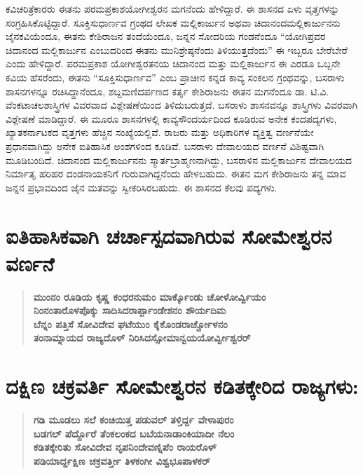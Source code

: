 ಕವಿಚರಿತ್ರೆಕಾರರು ಈತನು ಪರಮಪ್ರಕಾಶಯೋಗೀಶ್ವರನ ಮಗನೆಂದು ಹೇಳಿದ್ದಾರೆ. ಈ ಶಾಸನದ ಏಳು ವೃತ್ತಗಳನ್ನು ಸಂಗ್ರಹಿಸಿಕೊಟ್ಟಿದ್ದಾರೆ. ಸೂಕ್ತಿಸುಧಾರ್ಣವ ಗ್ರಂಥದ ಲೇಖಕ ಮಲ್ಲಿಕಾರ್ಜುನ ಅಥವಾ ಚಿದಾನಂದಮಲ್ಲಿಕಾರ್ಜುನನು ಜೈನಕವಿಯೆಂದೂ, ಈತನು ಕೇಶಿರಾಜನ ತಂದೆಯೆಂದೂ, ಜನ್ನನ ಸೋದರಿಯ ಗಂಡನೆಂದೂ “ಯೋಗಿಪ್ರವರ ಚಿದಾನಂದ ಮಲ್ಲಿಕಾರ್ಜುನ ಎಂಬುದರಿಂದ ಈತನು ಮುನಿಶ್ರೇಷ್ಠನೆಂದು ತಿಳಿಯುತ್ತದೆಂದು” ಈ ಇಬ್ಬರೂ ಬೇರೆಬೇರೆ ಎಂದು ಹೇಳಿದ್ದಾರೆ. ಪರಮಪ್ರಕಾಶ ಯೋಗೀಶ್ವರತನಯ ಚಿದಾನಂದ ಮತ್ತು ಮಲ್ಲಿಕಾರ್ಜುನ ಈ ಎರಡೂ ಒಬ್ಬನೇ ಕವಿಯ ಹೆಸರೆಂದು, ಈತನು “ಸೂಕ್ತಿಸುಧಾರ್ಣವ” ಎಂಬ ಪ್ರಾಚೀನ ಕನ್ನಡ ಕಾವ್ಯ ಸಂಕಲನ ಗ್ರಂಥವನ್ನು, ಬಸರಾಳು ಶಾಸನಗಳನ್ನೂ ರಚಿಸಿದ್ದಾನೆಂದೂ, ಶಬ್ದಮಣಿದರ್ಪಣದ ಕರ್ತೃ ಕೇಶಿರಾಜನು ಈತನ ಮಗನೆಂದೂ ಡಾ. ಟಿ.ವಿ. ವೆಂಕಟಾಚಲಶಾಸ್ತ್ರಿಗಳ ವಿವರವಾದ ವಿಶ್ಲೇಷಣೆಯಿಂದ ತಿಳಿದುಬರುತ್ತದೆ. ಬಸರಾಳು ಶಾಸನವನ್ನೂ ಶಾಸ್ತ್ರಿಗಳು ವಿವರವಾಗಿ ವಿಶ್ಲೇಷಣೆ ಮಾಡಿದ್ದಾರೆ. ಈ ಮೂರೂ ಶಾಸನಗಳಲ್ಲಿ ಕಾವ್ಯಸೌಂದರ್ಯದಿಂದ ಕೂಡಿರುವ ಅನೇಕ ಕಂದಪದ್ಯಗಳು, ಖ್ಯಾತಕರ್ನಾಟಕದ ವೃತ್ತಗಳು ಹೆಚ್ಚಿನ ಸಂಖ್ಯೆಯಲ್ಲಿವೆ. ರಾಜರು ಮತ್ತು ಅಧಿಕಾರಿಗಳ ವ್ಯಕ್ತಿತ್ವ ವರ್ಣನೆಯೇ ಪ್ರಧಾನವಾಗಿದ್ದು ಅನೇಕ ಐತಿಹಾಸಿಕ ಅಂಶಗಳಿಂದ ಕೂಡಿವೆ. ಬಸರಾಳು ದೇವಾಲಯದ ವರ್ಣನೆ ವಿಶಿಷ್ಟವಾಗಿ ಮೂಡಿಬಂದಿದೆ. ಚಿದಾನಂದ ಮಲ್ಲಿಕಾರ್ಜುನನು ಸ್ಮಾರ್ತ\break ಬ್ರಾಹ್ಮಣನಾಗಿದ್ದು, ಬಸರಾಳಿನ ಮಲ್ಲಿಕಾರ್ಜುನ ದೇವಾಲಯದ ನಿರ್ಮಾತೃ ಹರಿಹರ ದಂಡನಾಯಕನಿಗೆ ಗುರುವಾಗಿದ್ದನೆಂದು ಹೇಳಬಹುದು. ಈತನ ಮಗ ಕೇಶಿರಾಜನು ತನ್ನ ಮಾವ ಜನ್ನನ ಪ್ರಭಾವದಿಂದ ಜೈನ ಮತವನ್ನು ಸ್ವೀಕರಿಸಿರಬಹುದು. ಈ ಶಾಸನದ ಕೆಲವು ಪದ್ಯಗಳು.

\section*{ಐತಿಹಾಸಿಕವಾಗಿ ಚರ್ಚಾಸ್ಪದವಾಗಿರುವ ಸೋಮೇಶ್ವರನ ವರ್ಣನೆ}

\begin{verse}
\textbf{ಮುಂನಂ ರೂಡಿಯ ಕೃಷ್ಣ ಕಂಧರನುಮಂ ಮಾರ್ಕ್ಕೊಂಡು ಚೋಳೋರ್ವ್ವಿಯಂ \\ ನಿಂನಂತಾರೊಳಪೊಕ್ಕು ಸಾದಿಸಿದರಾರ್ಪ್ಪಾಂಡೇಶನಂ ಶೌರ್ಯದಿಮ \\ ಬೆನ್ನಂ ಪತ್ತಿಸೆ ಸೋವಿದೇವ ಘಟೆಯುಂ ಕೈಕೊಂಡರಾರ್ಚ್ಚೋಳನಂ \\ ತಂನಾಮ್ನಾಯದ ರಾಜ್ಯದೊಳ್​ ನಿರಿಸಿದಸ್ಸೋಮಾನ್ವಯಯೋರ್ವ್ವೀಶ್ವರರ್​}
\end{verse}

\vskip 2pt

\section*{ದಕ್ಷಿಣ ಚಕ್ರವರ್ತಿ ಸೋಮೇಶ್ವರನ ಕಡಿತಕ್ಕೇರಿದ ರಾಜ್ಯಗಳು:}

\begin{verse}
\textbf{ಗಡಿ ಮೂಡಲು ಸಲೆ ಕಂಚಿಯಿತ್ತ ಪಡುವಲ್​ ತಳ್ತಿರ್ದ್ದ ವೇಳಾಪುರಂ \\ ಬಡಗಲ್​ ಪೆರ್ದ್ದೊರೆ ತೆಂಕಲಂಕದ ಬಬೆಯನಾಡಾಂಕಿಯಾದೀ ನೆಲಂ \\ ಕಡಿತಕ್ಕೇರಿತು ಸೋವಿದೇವ ನೃಪನಿಂದೇವಣ್ನಿಪೆಂ ರಾಯರೊಳ್​ \\ ಪಡಿಯಾರ್ದ್ದಕ್ಷಿಣ ಚಕ್ರವರ್ತ್ತೀ ತಿಳಕಂಗೀ ವಿಶ್ವಭೂಪಾಳಕರ್​}
\end{verse}

